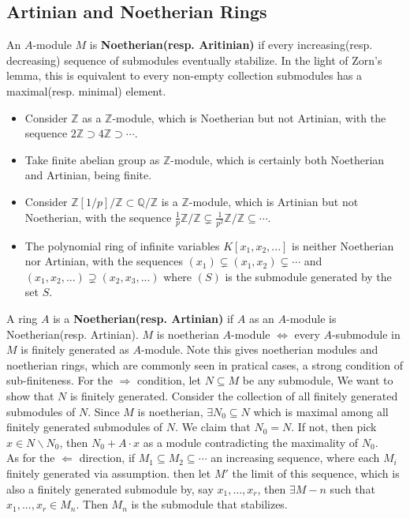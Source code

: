\documentclass[12pt]{article}
\theoremstyle{definition}
\theoremstyle{plain}
\newcommand{\rat}{\mathbb{Q}}
\newcommand{\z}{\mathbb{Z}}
\begin{document}
\subsection{Artinian and Noetherian Rings}
\Def An $A$-module $M$ is \textbf{Noetherian(resp. Aritinian)} if every increasing(resp. decreasing) sequence of submodules eventually stabilize.
\Rmk In the light of Zorn's lemma, this is equivalent to every non-empty collection submodules has a maximal(resp. minimal) element.
\leavevmode
\begin{itemize}
  \item Consider $\z$ as a $\z$-module, which is Noetherian but not Artinian, with the sequence $2\z\supset 4\z\supset\cdots$.
  \item Take finite abelian group as $\z$-module, which is certainly both Noetherian and Artinian, being finite.
  \item Consider $\z[1/p]/\z\subset \rat/\z$ is a $\z$-module, which is Artinian but not Noetherian, with the sequence $\frac{1}{p}\z/\z\subsetneq \frac{1}{p^2}\z/\z \subseteq \cdots$.
  \item The polynomial ring of infinite variables $K[x_1, x_2, ...]$ is neither Noetherian nor Artinian, with the sequences $(x_1)\subsetneq (x_1, x_2)\subsetneq \cdots$ and $(x_1, x_2, ...)\supsetneq (x_2, x_3,...)$ where $(S)$ is the submodule generated by the set $S$.
\end{itemize}
\Def A ring $A$ is a \textbf{Noetherian(resp. Artinian)} if $A$ as an $A$-module is Noetherian(resp. Artinian).
\Prop $M$ is noetherian $A$-module $\iff$ every $A$-submodule in $M$ is finitely generated as $A$-module.
\Rmk Note this gives noetherian modules and noetherian rings, which are commonly seen in pratical cases, a strong condition of sub-finiteness.
\proof For the $\Rightarrow$ condition, let $N\subseteq M$ be any submodule, We want to show that $N$ is finitely generated. Consider the collection of all finitely generated submodules of $N$. Since $M$ is noetherian, $\exists N_0\subseteq N$ which is maximal among all finitely generated submodules of $N$. We claim that $N_0=N$. If not, then pick $x\in N\backslash N_0$, then $N_0+A\cdot x$ as a module contradicting the maximality of $N_0$.\\
\indent As for the $\Leftarrow$ direction, if $M_1\subseteq M_2\subseteq \cdots$ an increasing sequence, where each $M_i$ finitely generated via assumption. then let $M'$ the limit of this sequence, which is also a finitely generated submodule by, say $x_1, ..., x_r$, then $\exists M-n$ such that $x_1,...,x_r\in M_n$. Then $M_n$ is the submodule that stabilizes.\qedhere
\end{document}
